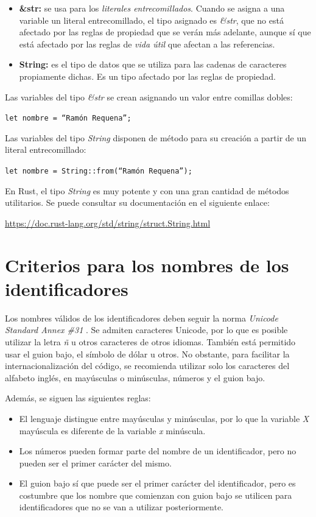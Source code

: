 \begin{itemize}
   \item \textbf{\&str:} se usa para los \textit{literales entrecomillados}. Cuando se asigna a una variable un literal entrecomillado, el tipo asignado es \textit{\&str}, que no está afectado por las reglas de propiedad que se verán más adelante, aunque sí que está afectado por las reglas de \textit{vida útil} que afectan a las referencias. 
   \item \textbf{String:} es el tipo de datos que se utiliza para las cadenas de caracteres propiamente dichas. Es un tipo afectado por las reglas de propiedad.
\end{itemize}

Las variables del tipo \textit{\&str} se crean asignando un valor entre comillas dobles:

{\centering \texttt{let nombre = ``Ramón Requena'';} \par}

Las variables del tipo \textit{String} disponen de método para su creación a partir de un literal entrecomillado:

{\centering \texttt{let nombre = String::from(``Ramón Requena'');} \par}

En Rust, el tipo \textit{String} es muy potente y con una gran cantidad de métodos utilitarios. Se puede consultar su documentación en el siguiente enlace:

{\centering \small \url{https://doc.rust-lang.org/std/string/struct.String.html} \par}

\section{Criterios para los nombres de los identificadores}
\noindent Los nombres válidos de los identificadores deben seguir la norma \textit{Unicode Standard Annex \#31} \citep{UAX31Unicode}. Se admiten caracteres Unicode, por lo que es posible utilizar la letra \textit{ñ} u otros caracteres de otros idiomas. También está permitido usar el guion bajo, el símbolo de dólar u otros. No obstante, para facilitar la internacionalización del código, se recomienda utilizar solo los caracteres del alfabeto inglés, en mayúsculas o minúsculas, números y el guion bajo. 

Además, se siguen las siguientes reglas:

\begin{itemize}
   \item El lenguaje distingue entre mayúsculas y minúsculas, por lo que la variable \textit{X} mayúscula es diferente de la variable \textit{x} minúscula.
   \item Los números pueden formar parte del nombre de un identificador, pero no pueden ser el primer carácter del mismo.
   \item El guion bajo sí que puede ser el primer carácter del identificador, pero es costumbre que los nombre que comienzan con guion bajo se utilicen para identificadores que no se van a utilizar posteriormente.
\end{itemize}

